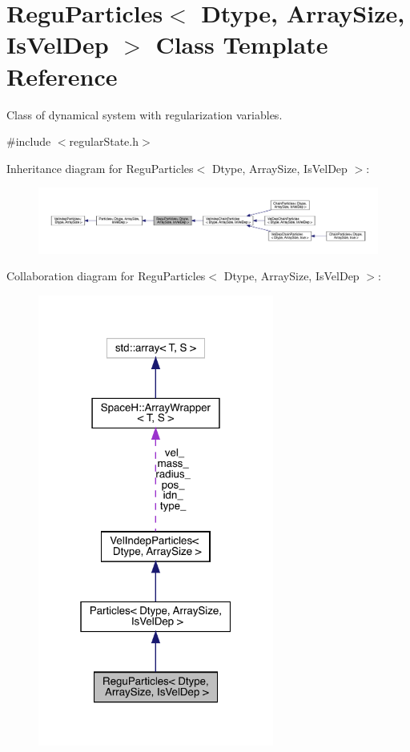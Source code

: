 \hypertarget{class_regu_particles}{}\section{Regu\+Particles$<$ Dtype, Array\+Size, Is\+Vel\+Dep $>$ Class Template Reference}
\label{class_regu_particles}


Class of dynamical system with regularization variables.  




{\ttfamily \#include $<$regular\+State.\+h$>$}



Inheritance diagram for Regu\+Particles$<$ Dtype, Array\+Size, Is\+Vel\+Dep $>$\+:
\nopagebreak
\begin{figure}[H]
\begin{center}
\leavevmode
\includegraphics[width=350pt]{class_regu_particles__inherit__graph}
\end{center}
\end{figure}


Collaboration diagram for Regu\+Particles$<$ Dtype, Array\+Size, Is\+Vel\+Dep $>$\+:
\nopagebreak
\begin{figure}[H]
\begin{center}
\leavevmode
\includegraphics[width=220pt]{class_regu_particles__coll__graph}
\end{center}
\end{figure}
